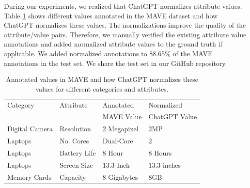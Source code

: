 During our experiments, we realized that ChatGPT normalizes attribute values. Table \ref{tab:value_normalization} shows different values annotated in the MAVE dataset and how ChatGPT normalizes these values.
The normalizations improve the quality of the attribute/value pairs. Therefore, we manually verified the existing attribute value annotations and added normalized attribute values to the ground truth if applicable. We added normalized annotations to 88.65\% of the MAVE annotations in the test set. We share the test set in our GitHub repository.


\begin{table}[h]
\caption{Annotated values in MAVE and how ChatGPT normalizes these values for different categories and attributes.}
\label{tab:value_normalization}
\begin{tabular}{@{}llll@{}}
\toprule
Category & Attribute         & Annotated & Normalized  \\
 &          & MAVE Value  & ChatGPT Value \\ \midrule
Digital Camera & Resolution   & 2 Megapixel              & 2MP                         \\
Laptops & No. Cores     & Dual-Core                & 2                           \\
Laptops & Battery Life        & 8 Hour                   & 8 Hours                     \\
Laptops & Screen Size         & 13.3-Inch                & 13.3 inches                 \\
Memory Cards & Capacity & 8 Gigabytes              & 8GB                         \\ \bottomrule
\end{tabular}
\end{table}


